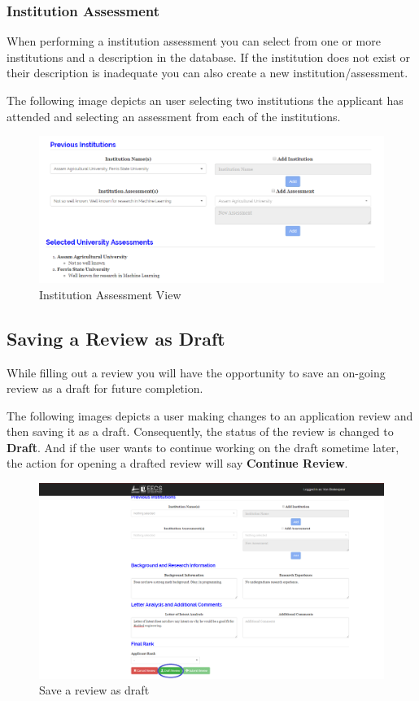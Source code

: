 \documentclass[fontsize=12pt,paper=letter,twoside]{scrartcl}
\begin{document}
\subsubsection{Institution Assessment}
When performing a institution assessment you can select from one or more institutions and a description in the database. If the institution does not exist or their description is inadequate you can also create a new institution/assessment.

\bigskip
\noindent The following image depicts an user selecting two institutions the applicant has attended and selecting an assessment from each of the institutions.

\begin{figure}[!htb]
\begin{center}
\includegraphics[width=.7\textwidth]{images/uni_assessment.png}
\end{center}
\caption{Institution Assessment View}
\label{fig:uni_assessment}
\end{figure}

\clearpage
\newpage
\subsection{Saving a Review as Draft}
While filling out a review you will have the opportunity to save an on-going review as a draft for future completion.

\bigskip
\noindent The following images depicts a user making changes to an application review and then saving it as a draft. Consequently, the status of the review is changed to \textbf{Draft}. And if the user wants to continue working on the draft sometime later, the action for opening a drafted review will say \textbf{Continue Review}.

\begin{figure}[!htb]
\begin{center}
\includegraphics[width=.9\textwidth]{images/save_as_draft_review.png}
\end{center}
\caption{Save a review as draft}
\label{fig:save_as_draft_review}
\end{figure}
\end{document}
